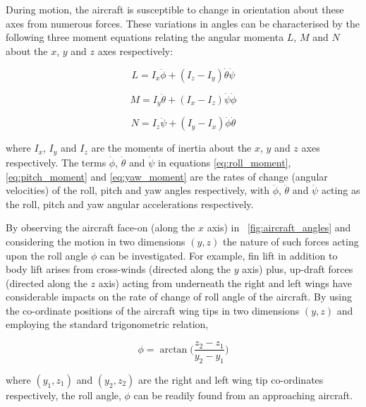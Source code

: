 \documentclass[11pt]{article}
\newcommand{\figref}[2][\figurename~]{#1\ref{#2}}
\begin{document}
During motion, the aircraft is susceptible to change in orientation about these axes from numerous forces. These variations in angles can be characterised by the following three moment equations \cite{Book02} relating the angular momenta $L$, $M$ and $N$ about the $x$, $y$ and $z$ axes respectively:

\begin{equation}
\label{eq:roll_moment}
L = I_x\ddot{\phi} + (I_z - I_y)\dot{\theta}\dot{\psi}
\end{equation}

\begin{equation}
\label{eq:pitch_moment}
M = I_y\ddot{\theta} + (I_x - I_z)\dot{\psi}\dot{\phi}
\end{equation}

\begin{equation}
\label{eq:yaw_moment}
N = I_z\ddot{\psi} + (I_y - I_x)\dot{\phi}\dot{\theta}
\end{equation}

where $I_x$, $I_y$ and $I_z$ are the moments of inertia about the $x$, $y$ and $z$ axes respectively. The terms $\dot{\phi}$, $\dot{\theta}$ and $\dot{\psi}$ in equations \eqref{eq:roll_moment}, \eqref{eq:pitch_moment} and \eqref{eq:yaw_moment} are the rates of change (angular velocities) of the roll, pitch and yaw angles respectively, with $\ddot{\phi}$, $\ddot{\theta}$ and $\ddot{\psi}$ acting as the roll, pitch and yaw angular accelerations respectively.

By observing the aircraft face-on (along the $x$ axis) in \figref{fig:aircraft_angles} and considering the motion in two dimensions $(y,z)$ the nature of such forces acting upon the roll angle $\phi$ can be investigated. For example, fin lift in addition to body lift arises from cross-winds (directed along the $y$ axis) plus, up-draft forces (directed along the $z$ axis) acting from underneath the right and left wings have considerable impacts on the rate of change of roll angle of the aircraft. By using the co-ordinate positions of the aircraft wing tips in two dimensions $(y,z)$ and employing the standard trigonometric relation,

\begin{equation}
\label{eq:roll_angle}
\phi = \arctan{\Big(\frac{z_2 - z_1}{y_2 - y_1}\Big)}
\end{equation}

where $(y_1,z_1)$ and $(y_2, z_2)$ are the right and left wing tip co-ordinates respectively, the roll angle, $\phi$ can be readily found from an approaching aircraft.
\end{document}
